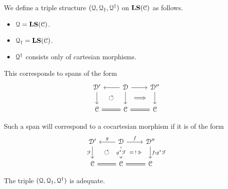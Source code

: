 \documentclass[main.tex]{subfiles}
\begin{document}
We define a triple structure $(\mathcal{Q}, \mathcal{Q}_{\dagger}, \mathcal{Q}^{\dagger})$ on $\mathbf{LS}(\mathcal{C})$ as follows.
\begin{itemize}
  \item $\mathcal{Q} = \mathbf{LS}(\mathcal{C})$.

  \item $\mathcal{Q}_{\dagger} = \mathbf{LS}(\mathcal{C})$.

  \item $\mathcal{Q}^{\dagger}$ consists only of cartesian morphisms.
\end{itemize}

This corresponds to spans of the form
\begin{equation*}
  \begin{tikzcd}
    \category{D}'
    \arrow[d, ""{name=L, right}]
    & \category{D}
    \arrow[d, ""{name=ML, left}, ""{name=MR, right}]
    \arrow[l, swap]
    \arrow[r]
    & \category{D}''
    \arrow[d, ""{name=R, left}]
    \\
    \category{C}
    \arrow[r, equals]
    &\category{C}
    & \category{C}
    \arrow[l, equals]
    \arrow[Rightarrow, from=MR, to=R, shorten=2ex]
    \arrow[Rightarrow, from=ML, to=L, phantom, "\circlearrowleft"{description}]
  \end{tikzcd}
\end{equation*}

Such a span will correspond to a cocartesian morphism if it is of the form
\begin{equation*}
  \begin{tikzcd}
    \category{D}'
    \arrow[d, "\mathcal{F}"{left}, ""{name=L, right}]
    & \category{D}
    \arrow[d, "g^{*}\mathcal{F}"{description}, ""{name=ML, left}, ""{name=MR, right}]
    \arrow[l, swap, "g"]
    \arrow[r, "f"]
    & \category{D}''
    \arrow[d, ""{name=R, left}, "f_{!}g^{*}\mathcal{F}"{right}]
    \\
    \category{C}
    \arrow[r, equals]
    &\category{C}
    & \category{C}
    \arrow[l, equals]
    \arrow[Rightarrow, from=MR, to=R, shorten=2ex, "!"{description}]
    \arrow[from=ML, to=L, phantom, "\circlearrowleft"{description}]
  \end{tikzcd}
\end{equation*}

\begin{proposition}
  \label{prop:q_triple_is_adequate}
  The triple $(\mathcal{Q}, \mathcal{Q}_{\dagger}, \mathcal{Q}^{\dagger})$ is adequate.
\end{proposition}
\end{document}
